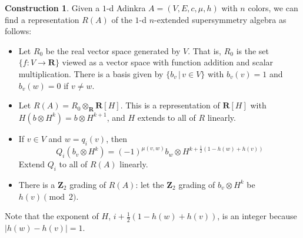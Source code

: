 \documentclass[12pt,twoside,singlespace]{article}
\numberwithin{equation}{section}
\theoremstyle{definition}
\newtheorem{construction}[equation]{Construction}
\newcommand{\ZZ}{\mathbf{Z}}
\newcommand{\RR}{\mathbf{R}}
\begin{document}
\begin{construction}
\label{cons:susy1d}
Given a $1$-d Adinkra $A=(V,E,c,\mu,h)$ with $n$ colors, we can find a representation $R(A)$ of the $1$-d $n$-extended supersymmetry algebra as follows:
\begin{itemize}
\item Let $R_0$ be the real vector space generated by $V$.  That is, $R_0$ is the set $\{f:V\to \RR\}$ viewed as a vector space with function addition and scalar multiplication.  There is a basis given by $\{b_v\,|\,v\in V\}$ with $b_v(v)=1$ and $b_v(w)=0$ if $v\not=w$.
\item Let $R(A)=R_0\otimes_\RR \RR[H]$.  This is a representation of $\RR[H]$ with $H(b\otimes H^k)=b\otimes H^{k+1}$, and $H$ extends to all of $R$ linearly.
\item If $v\in V$ and $w=q_i(v)$, then
\[Q_i(b_v\otimes H^k)=(-1)^{\mu(v,w)} b_w\otimes H^{k+\frac12(1-h(w)+h(v))}\]
Extend $Q_i$ to all of $R(A)$ linearly.
\item There is a $\ZZ_2$ grading of $R(A)$: let the $\ZZ_2$ grading of $b_v\otimes H^k$ be $h(v)\pmod{2}$.
\end{itemize}
\end{construction}
Note that the exponent of $H$, $i+\frac12(1-h(w)+h(v))$, is an integer because $|h(w)-h(v)|=1$.
\end{document}
